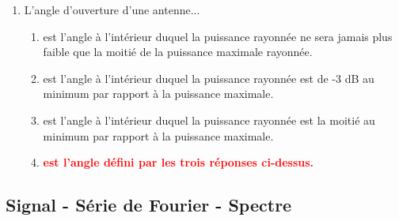 \documentclass[a4paper]{article}
\begin{document}
\begin{enumerate}[label=Q\arabic*.]
\item L'angle d'ouverture d'une antenne...
\begin{enumerate}
    \item est l'angle à l’intérieur duquel la puissance rayonnée ne sera jamais plus faible que la moitié de la puissance maximale rayonnée.
    \item est l'angle à l'intérieur duquel la puissance rayonnée est de -3 dB au minimum par rapport à la puissance maximale.
    \item est l'angle à l'intérieur duquel la puissance rayonnée est la moitié au minimum par rapport à la puissance maximale.
    \item \textcolor{red}{\textbf{est l'angle défini par les trois réponses ci-dessus.}}
\end{enumerate}


\end{enumerate}










\subsection{Signal - Série de Fourier - Spectre}
\end{document}
